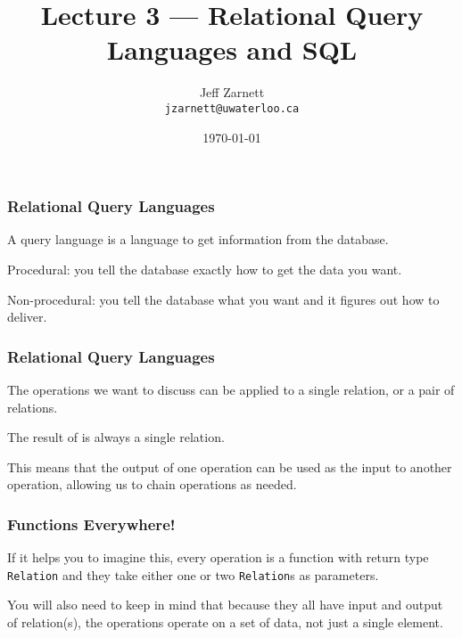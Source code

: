 

\title{Lecture 3 --- Relational Query Languages and SQL}

\author{Jeff Zarnett \\ \small \texttt{jzarnett@uwaterloo.ca}}
\date{\today}




\begin{frame}
  \titlepage

 \end{frame}



\begin{frame}
\frametitle{Relational Query Languages}

A \alert{query language} is a language to get information from the database. 

Procedural: you tell the database exactly how to get the data you want.

Non-procedural: you tell the database what you want and it figures out how to deliver.

\end{frame}



\begin{frame}
\frametitle{Relational Query Languages}

The operations we want to discuss can be applied to a single relation, or a pair of relations.

The result of is always a single relation. 

This means that the output of one operation can be used as the input to another operation, allowing us to chain operations as needed. 

\end{frame}



\begin{frame}
\frametitle{Functions Everywhere!}

If it helps you to imagine this, every operation is a function with return type \texttt{Relation} and they take either one or two \texttt{Relation}s as parameters.

You will also need to keep in mind that because they all have input and output of relation(s), the operations operate on a set of data, not just a single element.


\end{frame}



